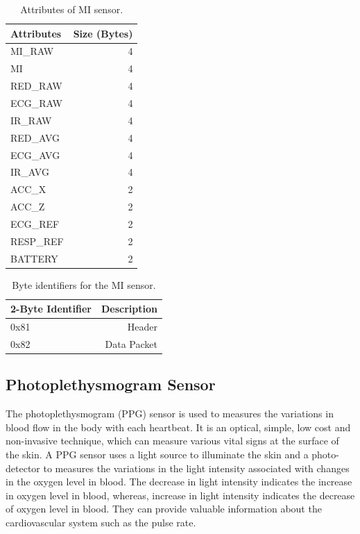 \renewcommand{\arraystretch}{2}
\begin{table}
	\caption{Attributes of MI sensor.} \label{tab:att_mi}
	
	\begin{center}
		\begin{tabular}{ | l | r | }
			\hline
			\textbf{Attributes} & \textbf{Size (Bytes)} \\ \hline
			MI\_RAW  & 4 \\ \hline
			MI  & 4  \\ \hline
			RED\_RAW  & 4  \\ \hline
			ECG\_RAW  & 4  \\ \hline
			IR\_RAW  & 4  \\ \hline
			RED\_AVG  & 4  \\ \hline
			ECG\_AVG  & 4  \\ \hline
			IR\_AVG  & 4  \\ \hline
			ACC\_X  & 2  \\ \hline
			ACC\_Z  & 2  \\ \hline
			ECG\_REF  & 2  \\ \hline
			RESP\_REF  & 2  \\ \hline
			BATTERY  & 2  \\ \hline
		\end{tabular}
	\end{center}
	
\end{table}


\renewcommand{\arraystretch}{2}
\begin{table}
	\caption{Byte identifiers for the MI sensor.} \label{tab:bi_mi}
	
	\begin{center}
		\begin{tabular}{ | l | r | }
			\hline
			\textbf{2-Byte Identifier} & \textbf{Description} \\ \hline
			0x81  & Header \\ \hline
			0x82  & Data Packet  \\ \hline
		\end{tabular}
	\end{center}
	
\end{table}

\subsection{Photoplethysmogram Sensor} \label{sec:ppg_def}
The photoplethysmogram (PPG) sensor is used to measures the variations in blood flow in the body with each heartbeat. It is an optical, simple, low cost and non-invasive technique, which can measure various vital signs at the surface of the skin. A PPG sensor uses a light source to illuminate the skin and a photo-detector to measures the variations in the light intensity associated with changes in the oxygen level in blood. The decrease in light intensity indicates the increase in oxygen level in blood, whereas, increase in light intensity indicates the decrease of oxygen level in blood. They can provide valuable information about the cardiovascular system such as the pulse rate.

